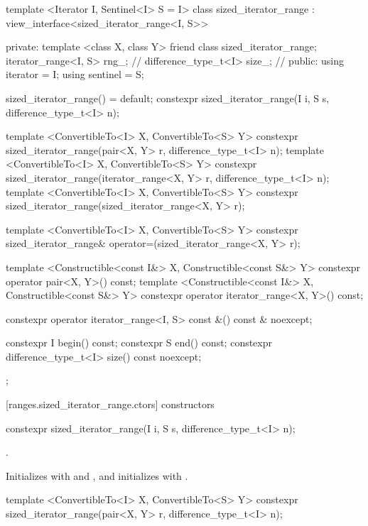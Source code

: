 %
\begin{codeblock}
template <Iterator I, Sentinel<I> S = I>
class sized_iterator_range
  : view_interface<sized_iterator_range<I, S>> {
private:
  template <class X, class Y> friend class sized_iterator_range;
  iterator_range<I, S> rng_; // \expos
  difference_type_t<I> size_; // \expos
public:
  using iterator = I;
  using sentinel = S;

  sized_iterator_range() = default;
  constexpr sized_iterator_range(I i, S s, difference_type_t<I> n);

  template <ConvertibleTo<I> X, ConvertibleTo<S> Y>
    constexpr sized_iterator_range(pair<X, Y> r, difference_type_t<I> n);
  template <ConvertibleTo<I> X, ConvertibleTo<S> Y>
    constexpr sized_iterator_range(iterator_range<X, Y> r, difference_type_t<I> n);
  template <ConvertibleTo<I> X, ConvertibleTo<S> Y>
    constexpr sized_iterator_range(sized_iterator_range<X, Y> r);

  template <ConvertibleTo<I> X, ConvertibleTo<S> Y>
    constexpr sized_iterator_range& operator=(sized_iterator_range<X, Y> r);

  template <Constructible<const I&> X, Constructible<const S&> Y>
    constexpr operator pair<X, Y>() const;
  template <Constructible<const I&> X, Constructible<const S&> Y>
    constexpr operator iterator_range<X, Y>() const;

  constexpr operator iterator_range<I, S> const &() const & noexcept;

  constexpr I begin() const;
  constexpr S end() const;
  constexpr difference_type_t<I> size() const noexcept;
};
\end{codeblock}

[ranges.sized_iterator_range.ctors]{ constructors}

%
\begin{itemdecl}
constexpr sized_iterator_range(I i, S s, difference_type_t<I> n);
\end{itemdecl}

\begin{itemdescr}
\pnum
\requires {}.

\pnum
\effects Initializes  with  and , and initializes
 with .
\end{itemdescr}

%
\begin{itemdecl}
template <ConvertibleTo<I> X, ConvertibleTo<S> Y>
  constexpr sized_iterator_range(pair<X, Y> r, difference_type_t<I> n);
\end{itemdecl}

